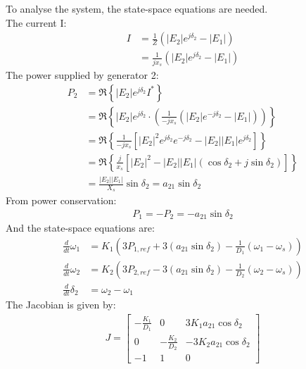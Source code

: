 \documentclass[12pt,English]{article}
\begin{document}

To analyse the system, the state-space equations are needed.\\
The current I:
\begin{align*}
I &= \frac{1}{Z}\left(\left|E_2\right|e^{j\delta_2}-\left|E_1\right|\right)\\
&= \frac{1}{jx_s}\left(\left|E_2\right|e^{j\delta_2}-\left|E_1\right|\right)   
\end{align*}
The power supplied by generator 2:
\begin{align*}
P_2 &= \Re\left\{\left|E_2\right|e^{j\delta_2}I^*\right\}\\
&= \Re\left\{\left|E_2\right|e^{j\delta_2}\cdot\left( \frac{1}{-jx_s}\left(\left|E_2\right|e^{-j\delta_2}-\left|E_1\right|\right)\right)\right\}\\
&= \Re\left\{\frac{1}{-jx_s}\left[\left|E_2\right|^{2}e^{j\delta_2}e^{-j\delta_2}-\left|E_2\right|\left|E_1\right|e^{j\delta_2}\right]\right\}\\
&= \Re\left\{\frac{j}{x_s}\left[\left|E_2\right|^{2}-\left|E_2\right|\left|E_1\right|\left(\cos{\delta_2}+j\sin{\delta_2}\right)\right]\right\}\\
&= \frac{\left|E_2\right|\left|E_1\right|}{X_s}\sin{\delta_2}=a_{21}\sin{\delta_2}
\end{align*}
From power conservation:
\begin{align*}
    P_1 = -P_2 = -a_{21}\sin{\delta_2}
\end{align*}
And the state-space equations are:
\begin{align*}
\frac{d}{dt}\omega_1&=K_1\left(3P_{1,ref}+3\left(a_{21}\sin{\delta_2}\right)-\frac{1}{D_1}\left(\omega_1-\omega_{s}\right)\right)\\
\frac{d}{dt}\omega_2&=K_2\left(3P_{2,ref}-3\left(a_{21}\sin{\delta_2}\right)-\frac{1}{D_2}\left(\omega_2-\omega_{s}\right)\right)\\
\frac{d}{dt}\delta_2&=\omega_2-\omega_1   
\end{align*}
The Jacobian is given by:
\begin{align}\label{two_jen_J}
J=\left[\begin{array}{ccc}
-\frac{K_1}{D_1} & 0 & 3K_1a_{21}\cos{\delta_2}\\
0 & -\frac{K_2}{D_2} & -3K_2a_{21}\cos{\delta_2}\\
-1 & 1 & 0
\end{array}\right]    
\end{align}
\end{document}
